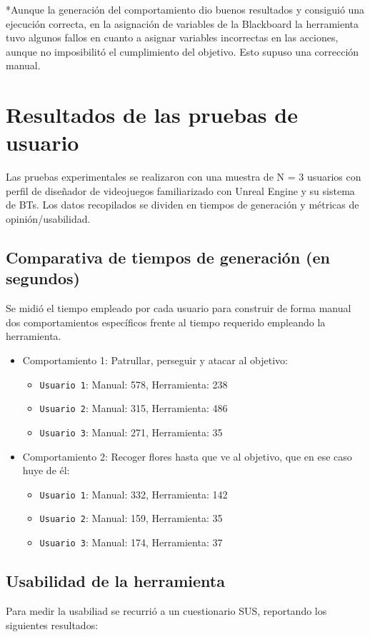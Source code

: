 *Aunque la generación del comportamiento dio buenos resultados y consiguió una ejecución correcta, en la asignación de variables de la Blackboard la herramienta tuvo algunos fallos en cuanto a asignar variables incorrectas en las acciones, aunque no imposibilitó el cumplimiento del objetivo.
Esto supuso una corrección manual.

\section{Resultados de las pruebas de usuario}
Las pruebas experimentales se realizaron con una muestra de N = 3 usuarios con perfil de diseñador de videojuegos familiarizado con Unreal Engine y su sistema de BTs.
Los datos recopilados se dividen en tiempos de generación y métricas de opinión/usabilidad.

\subsection{Comparativa de tiempos de generación (en segundos)}
Se midió el tiempo empleado por cada usuario para construir de forma manual dos comportamientos específicos frente al tiempo requerido empleando la herramienta.

\begin{itemize}
    \item Comportamiento 1: Patrullar, perseguir y atacar al objetivo:
    \begin{itemize}
        \item \texttt{Usuario 1}: Manual: 578, Herramienta: 238
        \item \texttt{Usuario 2}: Manual: 315, Herramienta: 486
        \item \texttt{Usuario 3}: Manual: 271, Herramienta: 35
    \end{itemize}
    \item Comportamiento 2: Recoger flores hasta que ve al objetivo, que en ese caso huye de él:
    \begin{itemize}
        \item \texttt{Usuario 1}: Manual: 332, Herramienta: 142
        \item \texttt{Usuario 2}: Manual: 159, Herramienta: 35
        \item \texttt{Usuario 3}: Manual: 174, Herramienta: 37
    \end{itemize}
\end{itemize}

\subsection{Usabilidad de la herramienta}
Para medir la usabiliad se recurrió a un cuestionario SUS, reportando los siguientes resultados:

